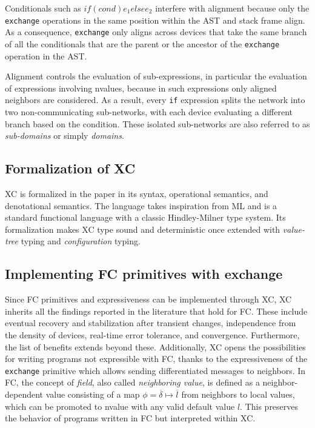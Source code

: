 Conditionals such as $if (cond) {e_1} else {e_2}$ interfere with alignment because only the \texttt{exchange} operations in the same position within the \ac{AST} and stack frame align\cite{xc}.
%
As a consequence, \texttt{exchange} only aligns across devices that take the same branch of all the conditionals that are the parent or the ancestor of the \texttt{exchange} operation in the \ac{AST}.

Alignment controls the evaluation of sub-expressions, in particular the evaluation of expressions involving nvalues, because in such expressions only aligned neighbors are considered.
%
As a result, every \texttt{if} expression splits the network into two non-communicating sub-networks, with each device evaluating a different branch based on the condition\cite{xc}.
%
These isolated sub-networks are also referred to as \textit{sub-domains} or simply \textit{domains}.

\subsection{Formalization of XC}

\ac{XC} is formalized in the paper\cite{xc} in its syntax, operational semantics, and denotational semantics.
%
The language takes inspiration from \ac{ML} and is a standard functional language with a classic Hindley-Milner type system.
%
Its formalization makes \ac{XC} type sound and deterministic once extended with \textit{value-tree} typing and \textit{configuration} typing\cite{xc}.

\subsection{Implementing FC primitives with exchange}

Since \ac{FC} primitives and expressiveness can be implemented through \ac{XC}, \ac{XC} inherits all the findings reported in the literature that hold for \ac{FC}.
%
These include eventual recovery and stabilization after transient changes\cite{self-stabilisation-in-fc}, independence from the density of devices\cite{density-independence-in-fc}, real-time error tolerance, and convergence\cite{real-time-error-tolerance-in-fc}.
%
Furthermore, the list of benefits extends beyond these\cite{xc}.
%
Additionally, \ac{XC} opens the possibilities for writing programs not expressible with \ac{FC}, thanks to the expressiveness of the \texttt{exchange} primitive which allows sending differentiated messages to neighbors.
%
In \ac{FC}, the concept of \textit{field}, also called \textit{neighboring value}, is defined as a neighbor-dependent value consisting of a map $\phi = \overline{\delta} \mapsto \overline{l}$ from neighbors to local values, which can be promoted to nvalue with any valid default value $l$.
%
This preserves the behavior of programs written in \ac{FC} but interpreted within \ac{XC}\cite{xc}.


